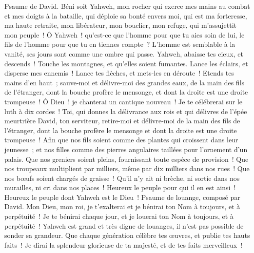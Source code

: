 \begin{multicols}{2}
\VerseOne{}Psaume de David. Béni soit Yahweh, mon rocher qui exerce mes mains au combat et mes doigts à la bataille,
qui déploie sa bonté envers moi, qui est ma forteresse, ma haute retraite, mon libérateur, mon bouclier, mon refuge, qui m'assujettit mon peuple~!
Ô Yahweh~! qu'est-ce que l'homme pour que tu aies soin de lui, le fils de l'homme pour que tu en tiennes compte~?
L'homme est semblable à la vanité, ses jours sont comme une ombre qui passe.
Yahweh, abaisse tes cieux, et descends~! Touche les montagnes, et qu'elles soient fumantes.
Lance les éclairs, et disperse mes ennemis~! Lance tes flèches, et mets-les en déroute~!
Etends tes mains d'en haut~; sauve-moi et délivre-moi des grandes eaux, de la main des fils de l'étranger,
dont la bouche profère le mensonge, et dont la droite est une droite trompeuse~!
Ô Dieu~! je chanterai un cantique nouveau~! Je te célébrerai sur le luth à dix cordes~!
Toi, qui donnes la délivrance aux rois et qui délivres de l'épée meurtrière David, ton serviteur,
retire-moi et délivre-moi de la main des fils de l'étranger, dont la bouche profère le mensonge et dont la droite est une droite trompeuse~!
Afin que nos fils soient comme des plantes qui croissent dans leur jeunesse~; et nos filles comme des pierres angulaires taillées pour l'ornement d'un palais.
Que nos greniers soient pleins, fournissant toute espèce de provision~! Que nos troupeaux multiplient par milliers, même par dix milliers dans nos rues~!
Que nos bœufs soient chargés de graisse~! Qu'il n'y ait ni brèche, ni sortie dans nos murailles, ni cri dans nos places~!
Heureux le peuple pour qui il en est ainsi~! Heureux le peuple dont Yahweh est le Dieu~!
\VerseOne{}Psaume de louange, composé par David.  Mon Dieu, mon roi, je t'exalterai et je bénirai ton Nom à toujours, et à perpétuité~!
 Je te bénirai chaque jour, et je louerai ton Nom à toujours, et à perpétuité~!
 Yahweh est grand et très digne de louanges, il n'est pas possible de sonder sa grandeur.
 Que chaque génération célèbre tes œuvres, et publie tes hauts faits~!
 Je dirai la splendeur glorieuse de ta majesté, et de tes faits merveilleux~!

\end{multicols}

